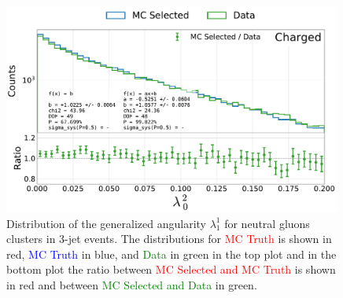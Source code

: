 \begin{figure}[h!]
  \centerfloat
  \includegraphics[width=0.99\textwidth, trim=0 0 0 0, clip, page=8]{figures/quarks/generalized_angularities_cha-down_sample=1.00-ML_vars=vertex-selection=b-ejet_min=4-n_iter_RS_lgb=99-n_iter_RS_xgb=9-cdot_cut=0.90-version=19.pdf}
  \caption[Generalized Angularities for Neutral Gluons Jets: $\lambda_1^1$]
          {Distribution of the generalized angularity $\lambda_1^1$ for neutral gluons clusters in 3-jet events. The distributions for \textcolor{red}{MC Truth} is shown in red, \textcolor{blue}{MC Truth} in blue, and \textcolor{green}{Data} in green in the top plot and in the bottom plot the ratio between \textcolor{red}{MC Selected and MC Truth} is shown in red and between \textcolor{green}{MC Selected and Data} in green. }
  \label{fig:q:generalized_angularities_neu_lambda_1_1}
\end{figure}
